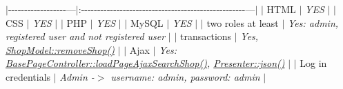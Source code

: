 $\vert$-\/-\/-\/-\/-\/-\/-\/-\/-\/-\/-\/-\/-\/-\/-\/-\/-\/-\/---$\vert$\+:-\/-\/-\/-\/-\/-\/-\/-\/-\/-\/-\/-\/-\/-\/-\/-\/-\/-\/-\/-\/-\/-\/-\/-\/-\/-\/-\/-\/-\/-\/-\/-\/-\/-\/-\/-\/-\/-\/-\/-\/-\/-\/-\/-\/-\/-\/-\/-\/-\/-\/-\/---$\vert$ $\vert$ H\+T\+M\+L $\vert$ {\itshape Y\+E\+S} $\vert$ $\vert$ C\+S\+S $\vert$ {\itshape Y\+E\+S} $\vert$ $\vert$ P\+H\+P $\vert$ {\itshape Y\+E\+S} $\vert$ $\vert$ My\+S\+Q\+L $\vert$ {\itshape Y\+E\+S} $\vert$ $\vert$ two roles at least $\vert$ {\itshape Yes\+: admin, registered user and not registered user} $\vert$ $\vert$ transactions $\vert$ {\itshape Yes, \hyperlink{classShopModel_ae035aa872e97c08247d203f90e228fe2}{Shop\+Model\+::remove\+Shop()}} $\vert$ $\vert$ Ajax $\vert$ {\itshape Yes\+: \hyperlink{classBasePageController_a96ace79928e80d29e6560b1fb965e859}{Base\+Page\+Controller\+::load\+Page\+Ajax\+Search\+Shop()}, \hyperlink{classPresenter_a02088a50a3134097a1b785b0315937b6}{Presenter\+::json()}} $\vert$ $\vert$ Log in credentials $\vert$ {\itshape Admin -\/$>$ username\+: admin, password\+: admin} $\vert$ 